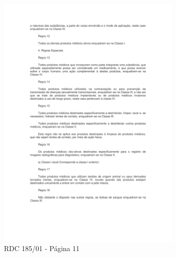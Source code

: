 \begin{anexosenv}
\begin{figure}[H]
    \centering
    \includegraphics[width=0.8\textwidth]{figuras/gerenciamento/RDC_2.pdf}
    \caption{RDC 185/01 - Página 11}
\label{fig:RDC_2}
\end{figure}


\end{anexosenv}
